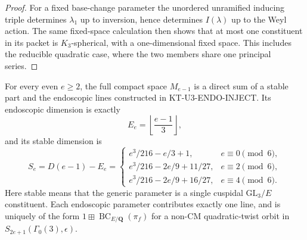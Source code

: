 \begin{proof}
For a fixed base-change parameter the unordered unramified inducing
triple determines $\lambda_1$ up to inversion, hence determines
$I(\lambda)$ up to the Weyl action. The same fixed-space calculation
then shows that at most one constituent in its packet is $K_3$-spherical,
with a one-dimensional fixed space. This includes the reducible
quadratic case, where the two members share one principal series.
\end{proof}

\begin{theorem}
For every even $e\ge2$, the full compact space $M_{e-1}$ is a direct
sum of a stable part and the endoscopic lines constructed in
KT-U3-ENDO-INJECT. Its endoscopic dimension is exactly
\[
             E_e=\left\lfloor\frac{e-1}{3}\right\rfloor,
\]
and its stable dimension is
\[
 S_e=D(e-1)-E_e=
 \begin{cases}
 e^3/216-e/3+1,&e\equiv0\pmod6,\\
 e^3/216-2e/9+11/27,&e\equiv2\pmod6,\\
 e^3/216-2e/9+16/27,&e\equiv4\pmod6.
 \end{cases}                                                   \tag{KT-E.3}
\]
Here stable means that the generic parameter is a single cuspidal
$\mathrm{GL}_3/E$ constituent. Each endoscopic parameter contributes
exactly one line, and is uniquely of the form
$1\boxplus\operatorname{BC}_{E/\mathbf Q}(\pi_f)$ for a non-CM
quadratic-twist orbit in $S_{2e+1}(\Gamma_0(3),\epsilon)$.
\end{theorem}
